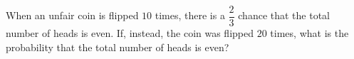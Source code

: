 When an unfair coin is flipped $10$ times, there is a $\dfrac{2}{3}$ chance that the total number of heads is even. If, instead, the coin was flipped $20$ times, what is the probability that the total number of heads is even?
